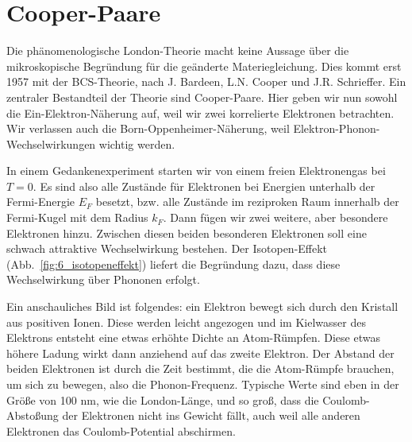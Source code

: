 \section{Cooper-Paare}

Die phänomenologische London-Theorie macht keine Aussage über die mikroskopische Begründung für die geänderte Materiegleichung. Dies kommt erst 1957 mit der BCS-Theorie, nach J. Bardeen, L.N. Cooper und J.R. Schrieffer. Ein zentraler Bestandteil der Theorie sind Cooper-Paare. Hier geben wir nun sowohl die Ein-Elektron-Näherung auf, weil wir zwei korrelierte Elektronen betrachten. Wir verlassen auch die Born-Oppenheimer-Näherung, weil Elektron-Phonon-Wechselwirkungen wichtig werden.

In einem Gedankenexperiment starten wir von einem freien Elektronengas bei $T=0$. Es sind also alle Zustände für Elektronen bei Energien unterhalb der Fermi-Energie $E_F$ besetzt, bzw. alle Zustände im reziproken Raum innerhalb der Fermi-Kugel mit dem Radius $k_F$. Dann fügen wir zwei weitere, aber besondere Elektronen hinzu. Zwischen diesen beiden besonderen Elektronen soll eine schwach attraktive Wechselwirkung bestehen. Der Isotopen-Effekt (Abb.~\ref{fig:6_isotopeneffekt}) liefert die Begründung dazu, dass diese Wechselwirkung über Phononen erfolgt. 

Ein anschauliches Bild ist folgendes: ein Elektron bewegt sich durch den Kristall aus positiven Ionen. Diese werden leicht angezogen und im Kielwasser des Elektrons entsteht eine etwas erhöhte Dichte an Atom-Rümpfen. Diese etwas höhere Ladung wirkt dann anziehend auf das zweite Elektron. Der Abstand der beiden Elektronen ist durch die Zeit bestimmt, die die Atom-Rümpfe brauchen, um sich zu bewegen, also die Phonon-Frequenz. Typische Werte sind eben in der Größe von 100 nm, wie die London-Länge, und so groß, dass die Coulomb-Abstoßung  der Elektronen nicht ins Gewicht fällt, auch weil alle anderen Elektronen das Coulomb-Potential abschirmen.

